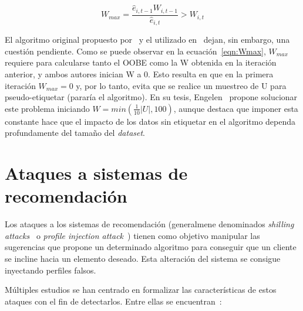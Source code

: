 \begin{equation}\label{eqn:Wmax} W_{max} = \frac{\hat{e}_{i,t-1}W_{i,t-1}}{\hat{e}_{i, t}} > W_{i,t} \end{equation}


\label{parag:Wmax_inicial} El algoritmo original propuesto por~\cite{originalCoForest2007} y el utilizado en~\cite{zhou2021SemisupervisedRecommendationAttack} dejan, sin embargo, una cuestión pendiente. Como se puede observar en la ecuación~\ref{eqn:Wmax}, $W_{max}$ requiere para calcularse tanto el OOBE como la W obtenida en la iteración anterior, y ambos autores inician W a 0. Esto resulta en que en la primera iteración $W_{max} = 0$ y, por lo tanto, evita que se realice un muestreo de U para pseudo-etiquetar (pararía el algoritmo). En su tesis, Engelen~\cite{engelen2018thesis} propone solucionar este problema iniciando $W = min(\frac{1}{10}|U|, 100)$, aunque destaca que imponer esta constante hace que el impacto de los datos sin etiquetar en el algoritmo dependa profundamente del tamaño del \textit{dataset}.

\section{Ataques a sistemas de recomendación}

Los ataques a los sistemas de recomendación (generalmene denominados \textit{shilling attacks}~\cite{mingdan2018ShillingAttacksAReview} o \textit{profile injection attack}~\cite{Mobasher2006Thesis}) tienen como objetivo manipular las sugerencias que propone un determinado algoritmo para conseguir que un cliente se incline hacia un elemento deseado. Esta alteración del sistema se consigue inyectando perfiles falsos.

Múltiples estudios se han centrado en formalizar las características de estos ataques con el fin de detectarlos. Entre ellas se encuentran~\cite{mingdan2018ShillingAttacksAReview}:


